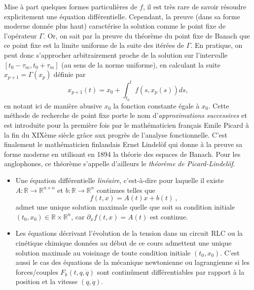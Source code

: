 \hypertarget{rem_approx_succ}{}
\begin{remarque}\label{rem_approx_succ}
Mise à part quelques formes particulières de \(f\), il est très rare de
savoir résoudre explicitement une équation différentielle. Cependant, la
preuve (dans sa forme moderne donnée plus haut) caractérise la solution
comme le point fixe de l'opérateur \(\Gamma\). Or, on sait par la preuve
du théorème du point fixe de Banach que ce point fixe est la limite
uniforme de la suite des itérées de \(\Gamma\). En pratique, on peut
donc s'approcher arbitrairement proche de la solution sur l'intervalle
\(\left[t_0-\tau_m,t_0+\tau_m \right]\) (au sens de la norme uniforme),
en calculant la suite \(x_{p+1} = \Gamma(x_p)\) définie par \[
x_{p+1}(t) =  x_0+\int_{t_0}^t f(s,x_p(s))ds  ,
\] en notant ici de manière abusive \(x_0\) la fonction constante égale
à \(x_0\). Cette méthode de recherche de point fixe porte le nom
d'\emph{approximations successives} et est introduite pour la première
fois par le mathématicien français Emile Picard à la fin du XIXème
siècle grâce aux progrès de l'analyse fonctionnelle. C'est finalement le
mathématicien finlandais Ernst Lindelöf qui donne à la preuve sa forme
moderne en utilisant en 1894 la théorie des espaces de Banach. Pour les
anglophones, ce théorème s'appelle d'ailleurs le \emph{théorème de
Picard-Lindelöf}.
\end{remarque}

\hypertarget{ex_lips}{}
\begin{exemple}\label{ex_lips}
\begin{itemize}
\item
  Une équation différentielle \emph{linéaire}, c'est-à-dire pour
  laquelle il existe \(A:\mathbb{R}\to\mathbb{R}^{n\times n}\) et
  \(b:\mathbb{R}\to\mathbb{R}^n\) continues telles que \[
  f(t,x) = A(t) x + b(t) \ ,
  \] admet une unique solution maximale quelle que soit sa condition
  initiale \((t_0,x_0)\in \mathbb{R}\times \mathbb{R}^n\), car
  \(\partial_x f(t,x) = A(t)\) est continue.
\item
  Les équations décrivant l'évolution de la tension dans un circuit RLC
  ou la cinétique chimique données au début de ce cours admettent une
  unique solution maximale au voisinage de toute condition initiale
  \((t_0,x_0)\). C'est aussi le cas des équations de la mécanique
  newtonienne ou lagrangienne si les forces/couples
  \(F_k(t,q,\dot{q})\) sont continûment différentiables par rapport à la
  position et la vitesse \((q,\dot{q})\).
\end{itemize}
\end{exemple}

